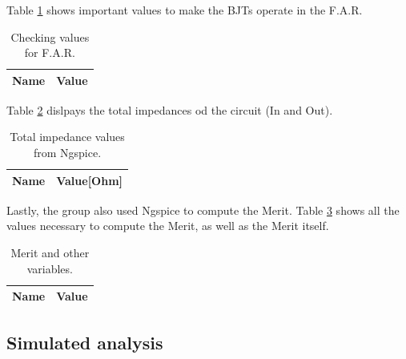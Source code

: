 Table \ref{tab:op_sim} shows important values to make the BJTs operate in the F.A.R.

\begin{table}[ht]
	\centering
	\begin{tabular}{|l|r|}
		\hline    
		{\bf Name} & {\bf Value} \\ \hline
    		
	\end{tabular}
	
	\caption{Checking values for F.A.R.}
    
\label{tab:op_sim}
\end{table}

Table \ref{tab:imp_sim} dislpays the total impedances od the circuit (In and Out).

\begin{table}[ht]
	\centering
	\begin{tabular}{|l|r|}
		\hline    
		{\bf Name} & {\bf Value[Ohm]} \\ \hline
    		
    		
	\end{tabular}
	
	\caption{Total impedance values from Ngspice.}
    
\label{tab:imp_sim}
\end{table}

Lastly, the group also used Ngspice to compute the Merit. Table \ref{tab:merit} shows all the 
values necessary to compute the Merit, as well as the Merit itself.

\begin{table}[ht]
	\centering
	\begin{tabular}{|l|r|}
		\hline    
		{\bf Name} & {\bf Value} \\ \hline
    		
	\end{tabular}
	
	\caption{Merit and other variables.}
    
\label{tab:merit}
\end{table}



\subsection{Simulated analysis}
\label{subsec:sim_an}

